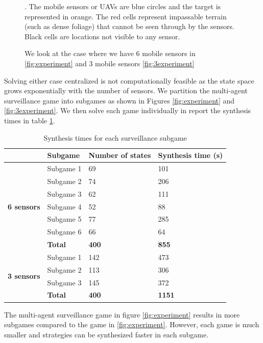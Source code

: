 \begin{figure}
{\hspace{.3cm}}

\caption{We look at the case where we have 6 mobile sensors in \ref{fig:experiment} and 3 mobile sensors \ref{fig:3experiment}\label{fig:bigexp}}. The mobile sensors or UAVs are blue circles and the target is represented in orange. The red cells represent impassable terrain (such as dense foliage) that cannot be seen through by the sensors. Black cells are locations not visible to any sensor.
\end{figure} 

Solving either case centralized is not computationally feasible as the state space grows exponentially with the number of sensors. We partition the multi-agent surveillance game into subgames as shown in Figures \ref{fig:experiment} and \ref{fig:3experiment}. We then solve each game individually in report the synthesis times in table \ref{tab:synthtime}.

\begin{table}[h!]
	\centering
	\caption{Synthesis times for each surveillance subgame}
	\label{tab:synthtime}
	\begin{tabular}{c|l|l|l}
		\multicolumn{1}{l|}{}                                    & \textbf{Subgame} & \textbf{Number of states} & \textbf{Synthesis time (s)} \\ \hline \hline
		\multirow{7}{*}{\textbf{6 sensors}}
		& Subgame 1   & 69     & 101                          \\
	    & Subgame 2   & 74     & 206                          \\
		& Subgame 3   & 62     & 111                          \\
		& Subgame 4   & 52     & 88                          \\
		& Subgame 5   & 77     & 285                          \\
		& Subgame 6   & 66     & 64                          \\ \hline
		& \textbf{Total}   & \textbf{400}         & \textbf{855}                         \\ \hline
		\multicolumn{1}{l|}{\multirow{4}{*}{\textbf{3 sensors}}} & Subgame 1        & 142 & 473                         \\
		\multicolumn{1}{l|}{}                                    & Subgame 2        & 113 & 306                         \\
		\multicolumn{1}{l|}{}                                    & Subgame 3        & 145 & 372                         \\ \hline
		\multicolumn{1}{l|}{}                                    &  \textbf{Total} & \textbf{400}            & \textbf{1151}                        
	\end{tabular}
\end{table}

The multi-agent surveillance game in figure \ref{fig:experiment} results in more subgames compared to the game in \ref{fig:experiment}. However, each game is much smaller and strategies can be synthesized faster in each subgame. 